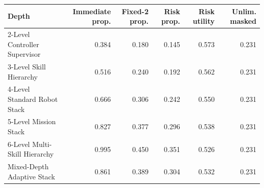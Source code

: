 \begin{tabular}{lrrrrr}
\toprule
Depth & Immediate prop. & Fixed-2 prop. & Risk prop. & Risk utility & Unlim. masked \\
\midrule
2-Level Controller Supervisor & 0.384 & 0.180 & 0.145 & 0.573 & 0.231 \\
3-Level Skill Hierarchy & 0.516 & 0.240 & 0.192 & 0.562 & 0.231 \\
4-Level Standard Robot Stack & 0.666 & 0.306 & 0.242 & 0.550 & 0.231 \\
5-Level Mission Stack & 0.827 & 0.377 & 0.296 & 0.538 & 0.231 \\
6-Level Multi-Skill Hierarchy & 0.995 & 0.450 & 0.351 & 0.526 & 0.231 \\
Mixed-Depth Adaptive Stack & 0.861 & 0.389 & 0.304 & 0.532 & 0.231 \\
\bottomrule
\end{tabular}
